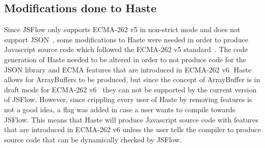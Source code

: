 \subsection{Modifications done to Haste}
Since JSFlow only supports ECMA-262 v5 in non-strict mode and does not support JSON~\cite{jsflow}, some modifications to Haste were needed in order to produce Javascript source code which followed the ECMA-262 v5 standard~\cite{ecma262v5}. The code generation of Haste needed to be altered in order to not produce code for the JSON library and ECMA features that are introduced in ECMA-262 v6. Haste allows for ArrayBuffers to be produced, but since the concept of ArrayBuffer is in draft mode for ECMA-262 v6~\cite{js_arraybuffer, ecma_arraybuffer} they can not be supported by the current version of JSFlow. However, since crippling every user of Haste by removing features is not a good idea, a flag was added in case a user wants to compile towards JSFlow. This means that Haste will produce Javascript source code with features that are introduced in ECMA-262 v6 unless the user tells the compiler to produce source code that can be dynamically checked by JSFlow.
